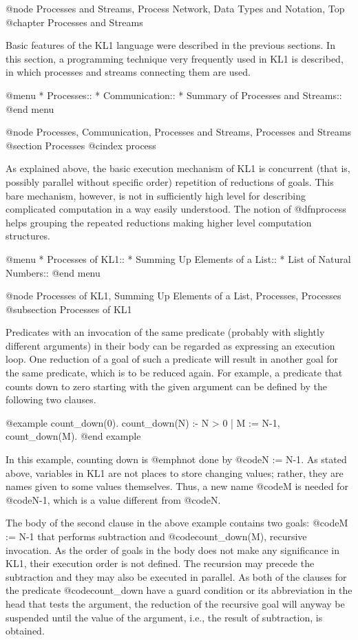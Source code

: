 {@node Processes and Streams, Process Network, Data Types and Notation, Top
@chapter Processes and Streams

Basic features of the KL1 language were described in the previous
sections.  In this section, a programming technique very frequently used
in KL1 is described, in which processes and streams connecting them are
used.

@menu
* Processes::                   
* Communication::               
* Summary of Processes and Streams::  
@end menu

@node Processes, Communication, Processes and Streams, Processes and Streams
@section Processes
@cindex process

As explained above, the basic execution mechanism of KL1 is concurrent
(that is, possibly parallel without specific order) repetition of
reductions of goals.  This bare mechanism, however, is not in
sufficiently high level for describing complicated computation in a way
easily understood.  The notion of @dfn{process} helps grouping the
repeated reductions making higher level computation structures.

@menu
* Processes of KL1::            
* Summing Up Elements of a List::  
* List of Natural Numbers::     
@end menu

@node Processes of KL1, Summing Up Elements of a List, Processes, Processes
@subsection Processes of KL1

Predicates with an invocation of the same predicate (probably with
slightly different arguments) in their body can be regarded as
expressing an execution loop.  One reduction of a goal of such a
predicate will result in another goal for the same predicate, which
is to be reduced again.  For example, a predicate that counts down to
zero starting with the given argument can be defined by the following
two clauses.

@example
count_down(0).
count_down(N) :- N > 0 | M := N-1, count_down(M).
@end example

In this example, counting down is @emph{not} done by @code{N := N-1}.
As stated above, variables in KL1 are not places to store changing
values; rather, they are names given to some values themselves.  Thus, a
new name @code{M} is needed for @code{N-1}, which is a value different
from @code{N}.

The body of the second clause in the above example contains two goals:
@code{M := N-1} that performs subtraction and @code{count_down(M)},
recursive invocation.  As the order of goals in the body does not make
any significance in KL1, their execution order is not defined.  The
recursion may precede the subtraction and they may also be executed in
parallel.  As both of the clauses for the predicate @code{count_down}
have a guard condition or its abbreviation in the head that tests the
argument, the reduction of the recursive goal will anyway be suspended
until the value of the argument, i.e., the result of subtraction, is
obtained.

}
